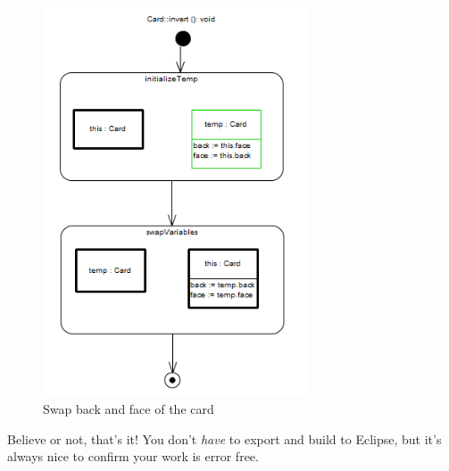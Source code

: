 \begin{stepbystep}
\begin{figure}[htbp]
\begin{center}
  \includegraphics[width=0.7\textwidth]{../../org.moflon.doc.handbook.03_storyDiagrams/07_invertCard/visICImages/ea_invertComplete}
  \caption{Swap back and face of the card}  
  \label{ea:sdm_invertComplete}
\end{center}
\end{figure}

\vspace{0.5cm}

\item Believe or not, that's it! You don't \emph{have} to export and build to Eclipse, but it's always nice to confirm your work is error
free.

\end{stepbystep}
